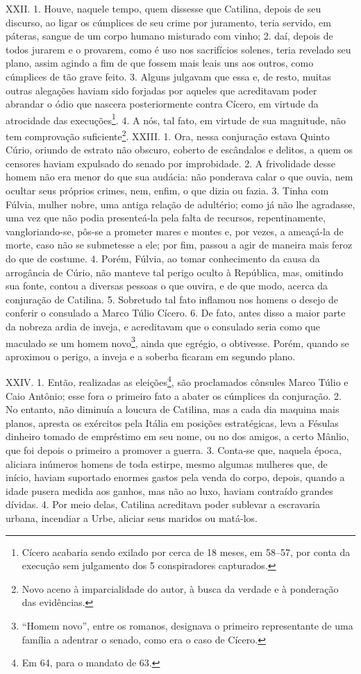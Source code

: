 XXII. 1. Houve, naquele tempo, quem dissesse que Catilina, depois de seu
discurso, ao ligar os cúmplices de seu crime por juramento, teria servido, em
páteras, sangue de um corpo humano misturado com vinho; 2. daí, depois de todos
jurarem e o provarem, como é uso nos sacrifícios solenes, teria revelado
seu plano, assim agindo a fim de que fossem mais leais uns aos outros, como
cúmplices de tão grave feito. 3. Alguns julgavam que essa e, de resto, muitas
outras alegações haviam sido forjadas por aqueles que acreditavam poder
abrandar o ódio que nascera posteriormente contra Cícero, em virtude da
atrocidade das execuções\footnote{Cícero acabaria sendo exilado por cerca de 18
meses, em 58--57, por conta da execução sem julgamento dos 5 conspiradores
capturados.}. 4. A nós, tal fato, em virtude de sua magnitude, não tem
comprovação suficiente\footnote{Novo aceno à imparcialidade do autor, à busca
da verdade e à ponderação das evidências.}.  XXIII. 1. Ora, nessa conjuração
estava Quinto Cúrio, oriundo de estrato não obscuro, coberto de escândalos e
delitos, a quem os censores haviam expulsado do senado por improbidade. 2. A
frivolidade desse homem não era menor do que sua audácia: não ponderava calar o
que ouvia, nem ocultar seus próprios crimes, nem, enfim, o que dizia ou fazia.
3. Tinha com Fúlvia, mulher nobre, uma antiga relação de adultério; como já não lhe agradasse, uma vez que não podia presenteá-la pela falta de recursos,
repentinamente, vangloriando-se, pôs-se a prometer mares e montes e, por vezes,
a ameaçá-la de morte, caso não se submetesse a ele; por fim, passou a agir de
maneira mais feroz do que de costume. 4. Porém, Fúlvia, ao tomar conhecimento
da causa da arrogância de Cúrio, não manteve tal perigo oculto à República,
mas, omitindo sua fonte, contou a diversas pessoas o que ouvira, e de que modo,
acerca da conjuração de Catilina. 5. Sobretudo tal fato inflamou nos homens o
desejo de conferir o consulado a Marco Túlio Cícero. 6. De fato, antes disso a
maior parte da nobreza ardia de inveja, e acreditavam que o consulado seria
como que maculado se um homem novo\footnote{``Homem novo'', entre os romanos,
designava o primeiro representante de uma família a adentrar o senado, como era
o caso de Cícero.}, ainda que egrégio, o obtivesse. Porém, quando se aproximou
o perigo, a inveja e a soberba ficaram em segundo plano.

XXIV. 1. Então, realizadas as eleições\footnote{Em 64, para o mandato de  63.},
são proclamados cônsules Marco Túlio e Caio Antônio; esse fora o primeiro fato
a abater os cúmplices da conjuração. 2. No entanto, não diminuía a loucura de
Catilina, mas a cada dia maquina mais planos, apresta os exércitos pela Itália
em posições estratégicas, leva a Fésulas dinheiro tomado de empréstimo em seu
nome, ou no dos amigos, a certo Mânlio, que foi depois o primeiro a promover a
guerra. 3. Conta-se que, naquela época, aliciara inúmeros homens de toda
estirpe, mesmo algumas mulheres que, de início, haviam suportado enormes gastos
pela venda do corpo, depois, quando a idade pusera medida aos ganhos, mas não
ao luxo, haviam contraído grandes dívidas. 4. Por meio delas, Catilina
acreditava poder sublevar a escravaria urbana, incendiar a Urbe, aliciar seus
maridos ou matá-los.

